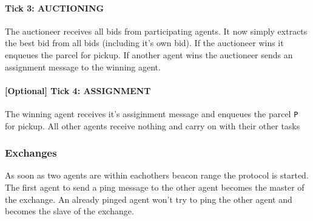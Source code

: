 \documentclass[../main.tex]{subfiles}
\begin{document}
\paragraph{Tick 3: AUCTIONING}
The auctioneer receives all bids from participating agents.
It now simply extracts the best bid from all bids (including it's own bid).
If the auctioneer wins it enqueues the parcel for pickup.
If another agent wins the auctioneer sends an assignment message to the winning agent.
\paragraph{[Optional] Tick 4: ASSIGNMENT}
The winning agent receives it's assiginment message and enqueues the parcel \texttt{P} for pickup.
All other agents receive nothing and carry on with their other tasks

\subsubsection{Exchanges}

As soon as two agents are within eachothers beacon range the protocol is started.
The first agent to send a ping message to the other agent becomes the master of the exchange.
An already pinged agent won't try to ping the other agent and becomes the slave of the exchange.
\end{document}
